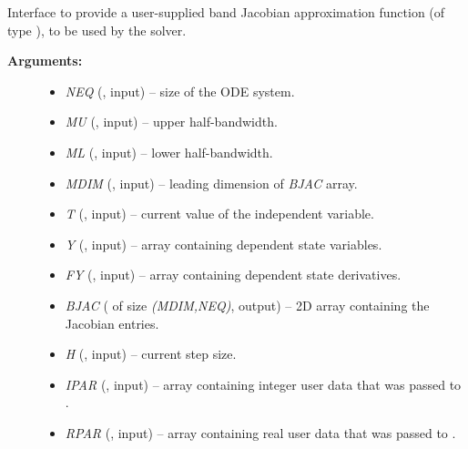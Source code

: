 \documentclass[letterpaper,10pt,english]{sphinxmanual}
\begin{document}
\begin{fulllineitems}
\label{f_interface/Usage:f/_/FARKBJAC}
Interface to provide a user-supplied band Jacobian approximation
function (of type ), to be used by the
{\hyperref[f_interface/Usage:f/_/FARKBAND]{}} solver.
\begin{description}
\item[{\textbf{Arguments:}}] \leavevmode\begin{itemize}
\item {} 
\emph{NEQ} (, input) -- size of the ODE system.

\item {} 
\emph{MU}   (, input) -- upper half-bandwidth.

\item {} 
\emph{ML}   (, input) -- lower half-bandwidth.

\item {} 
\emph{MDIM} (, input) -- leading dimension of \emph{BJAC} array.

\item {} 
\emph{T}    (, input) -- current value of the independent variable.

\item {} 
\emph{Y}    (, input) -- array containing dependent state variables.

\item {} 
\emph{FY}   (, input) -- array containing dependent state derivatives.

\item {} 
\emph{BJAC} ( of size \emph{(MDIM,NEQ)}, output) -- 2D array
containing the Jacobian entries.

\item {} 
\emph{H}    (, input) -- current step size.

\item {} 
\emph{IPAR} (, input) -- array containing integer user data that was passed to
{\hyperref[f_interface/Usage:f/_/FARKMALLOC]{}}.

\item {} 
\emph{RPAR} (, input) -- array containing real user data that was passed to
{\hyperref[f_interface/Usage:f/_/FARKMALLOC]{}}.


\end{itemize}
\end{description}
\end{fulllineitems}
\end{document}
